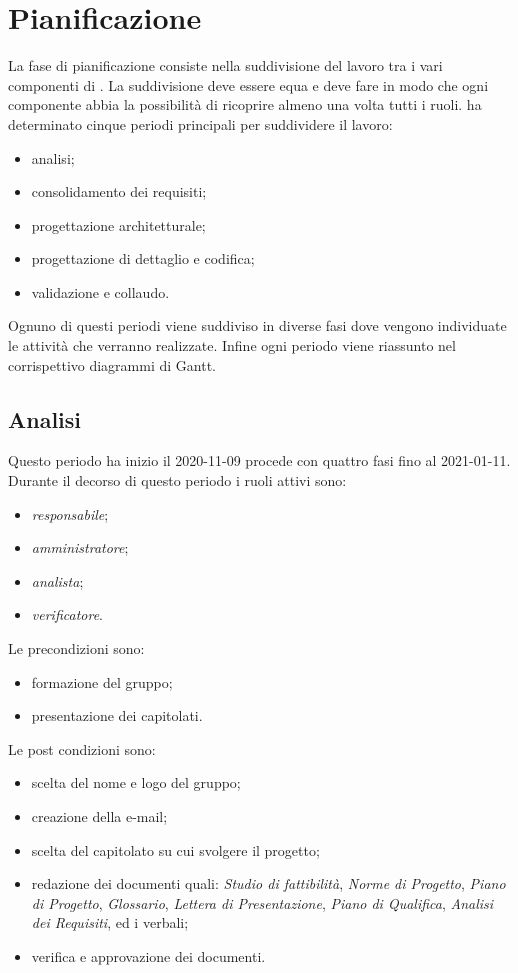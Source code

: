 \section{Pianificazione}
La fase di pianificazione consiste nella suddivisione del lavoro tra i vari componenti di \Gruppo. La suddivisione deve essere equa e deve fare in modo che ogni componente abbia la possibilità di ricoprire almeno una volta tutti i ruoli.
\Gruppo ha determinato cinque periodi principali per suddividere il lavoro:
\begin{itemize}
\item analisi;
\item consolidamento dei requisiti;
\item progettazione architetturale;
\item progettazione di dettaglio e codifica;
\item validazione e collaudo.
\end{itemize}
Ognuno di questi periodi viene suddiviso in diverse fasi dove vengono individuate le attività che verranno realizzate.
Infine ogni periodo viene riassunto nel corrispettivo diagrammi di Gantt.
\subsection{Analisi}
Questo periodo ha inizio il 2020-11-09 procede con quattro fasi fino al 2021-01-11.
Durante il decorso di questo periodo i ruoli attivi sono:
\begin{itemize}
\item \textit{responsabile};
\item \textit{amministratore};
\item \textit{analista};
\item \textit{verificatore}.
\end{itemize}
Le precondizioni sono:
\begin{itemize}
	\item formazione del gruppo;
	\item presentazione dei capitolati.
\end{itemize}
Le post condizioni sono:
\begin{itemize}
	\item scelta del nome e logo del gruppo;
	\item creazione della e-mail;
	\item scelta del capitolato su cui svolgere il progetto;
	\item redazione dei documenti quali: \textit{Studio di fattibilità}, \textit{Norme di Progetto}, \textit{Piano di Progetto}, \textit{Glossario}, \textit{Lettera di Presentazione}, \textit{Piano di Qualifica}, \textit{Analisi dei Requisiti}, ed i verbali;
	\item verifica e approvazione dei documenti.
\end{itemize}
